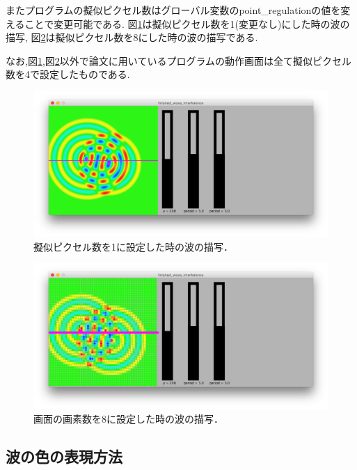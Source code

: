 \newpage
またプログラムの擬似ピクセル数はグローバル変数のpoint\_regulationの値を変えることで変更可能である.
図\ref{fig:1pxceldraw}は擬似ピクセル数を1(変更なし)にした時の波の描写,
 図\ref{fig:8pxceldraw}は擬似ピクセル数を8にした時の波の描写である.
 
 なお,図\ref{fig:1pxceldraw},図\ref{fig:8pxceldraw}以外で論文に用いているプログラムの動作画面は全て擬似ピクセル数を4で設定したものである.


\begin{figure}[H]
 \begin{center}
  \includegraphics[width=140mm]{../implement/pointregulation1.png}
 \end{center}
 \caption{擬似ピクセル数を1に設定した時の波の描写．}
 \label{fig:1pxceldraw}
\end{figure}

\begin{figure}[H]
 \begin{center}
  \includegraphics[width=140mm]{../implement/pointregulation8.png}
 \end{center}
 \caption{画面の画素数を8に設定した時の波の描写．}
 \label{fig:8pxceldraw}
\end{figure}


\subsection{波の色の表現方法}

